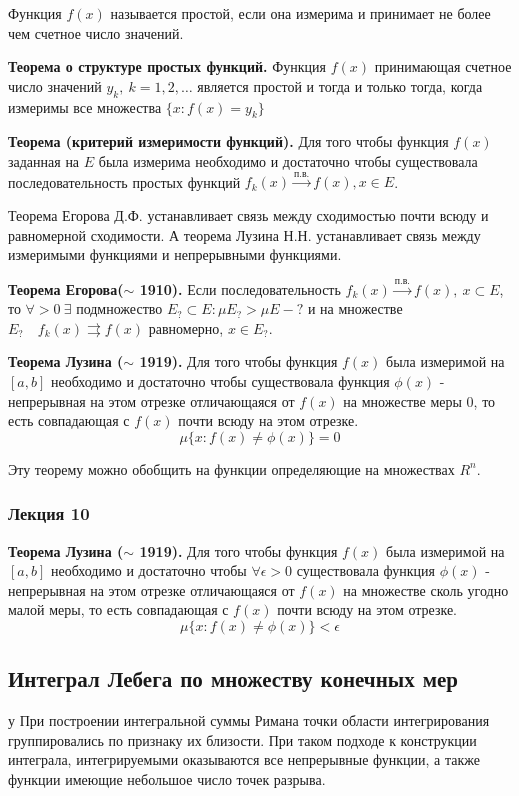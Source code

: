 \documentclass[14pt]{extarticle}
\theoremstyle{definition}
\theoremstyle{remark}
\renewcommand{\[}{\begin{dmath*}[compact]}
\renewcommand{\]}{\end{dmath*}}
\newcommand{\sep}{ , \ \allowbreak }
\newcommand{\tth}[1][]{\textbf{Теорема#1.}}
\begin{document}
Функция $f(x)$ называется простой, если она измерима и принимает не более чем счетное число значений.

\tth[ о структуре простых функций] Функция $f(x)$ принимающая счетное число значений $y_k\sep k=1,2,\dots$ является простой и тогда и только тогда, когда измеримы все множества $\{x: f(x) = y_k \}$

\tth[ (критерий измеримости функций)] Для того чтобы функция $f(x)$ заданная на $E$ была измерима необходимо и достаточно чтобы существовала последовательность простых функций $f_k (x) \xrightarrow{\text{п.в.}} f(x), x \in E$.

Теорема Егорова Д.Ф. устанавливает связь между сходимостью почти всюду и равномерной сходимости. А теорема Лузина Н.Н. устанавливает связь между измеримыми функциями и непрерывными функциями.

\tth[ Егорова($\sim$ 1910)] Если последовательность $f_k(x) \xrightarrow{п.в.} f(x) \sep x \subset E$, то $\forall  > 0 \ \exists$ подмножество $ E_? \subset E : \mu E_? > \mu E - ? $ и на множестве $E_? \quad f_k(x) \rightrightarrows f(x)$ равномерно, $x \in E_?$.

\tth[ Лузина ($\sim$ 1919)] Для того чтобы функция $f(x)$ была измеримой на $[a,b]$ необходимо и достаточно чтобы существовала функция $\phi(x)$ - непрерывная на этом отрезке отличающаяся от $f(x)$ на множестве меры 0, то есть совпадающая с $f(x)$ почти всюду на этом отрезке.
\[\mu\{x:f(x) \neq \phi (x)\} = 0\]

Эту теорему можно обобщить на функции определяющие на множествах $R^n$.

\subsubsection{Лекция 10}

\tth[ Лузина ($\sim$ 1919)] Для того чтобы функция $f(x)$ была измеримой на $[a,b]$ необходимо и достаточно чтобы $\forall \epsilon > 0$ существовала функция $\phi(x)$ - непрерывная на этом отрезке отличающаяся от $f(x)$ на множестве сколь угодно малой меры, то есть совпадающая с $f(x)$ почти всюду на этом отрезке.
\[\mu\{x:f(x) \neq \phi (x)\} < \epsilon\]

\subsection{Интеграл Лебега по множеству конечных мер}
у
При построении интегральной суммы Римана точки области интегрирования группировались по признаку их близости. При таком подходе к конструкции интеграла, интегрируемыми оказываются все непрерывные функции, а также функции имеющие небольшое число точек разрыва.
\end{document}
